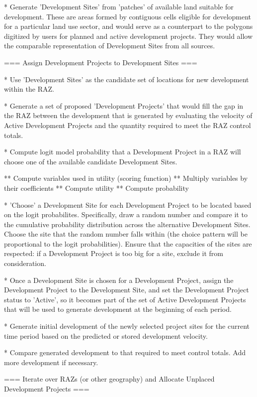 * Generate 'Development Sites' from 'patches' of available land suitable for development.  These are areas formed by contiguous cells eligible for development for a particular land use sector, and would serve as a counterpart to the polygons digitized by users for planned and active development projects.  They would allow the comparable representation of Development Sites from all sources.

=== Assign Development Projects to Development Sites ===

* Use 'Development Sites' as the candidate set of locations for new development within the RAZ.

* Generate a set of proposed 'Development Projects' that would fill the gap in the RAZ between the development that is generated by evaluating the velocity of Active Development Projects and the quantity required to meet the RAZ control totals.

* Compute logit model probability that a Development Project in a RAZ will choose one of the available candidate Development Sites.

** Compute variables used in utility (scoring function)
** Multiply variables by their coefficients
** Compute utility
** Compute probability

* 'Choose' a Development Site for each Development Project to be located based on the logit probabilites.  Specifically, draw a random number and compare it to the cumulative probability distribution across the alternative Development Sites.  Choose the site that the random number falls within (the choice pattern will be proportional to the logit probabilities).  Ensure that the capacities of the sites are respected: if a Development Project is too big for a site, exclude it from consideration.

* Once a Development Site is chosen for a Development Project, assign the Development Project to the Development Site, and set the Development Project status to 'Active', so it becomes part of the set of Active Development Projects that will be used to generate development at the beginning of each period.

* Generate initial development of the newly selected project sites for the current time period based on the predicted or stored development velocity.

* Compare generated development to that required to meet control totals.  Add more development if necessary.

=== Iterate over RAZs (or other geography) and Allocate Unplaced Development Projects ===

